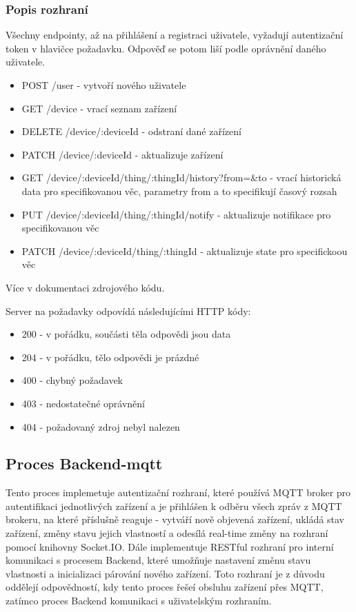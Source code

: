 \subsubsection{Popis rozhraní}
Všechny endpointy, až na přihlášení a registraci uživatele, vyžadují autentizační token v hlavičce požadavku. Odpověď se potom liší podle oprávnění daného uživatele.
\begin{itemize}
    \item POST /user - vytvoří nového uživatele
    \item GET /device - vrací seznam zařízení
    \item DELETE /device/:deviceId - odstraní dané zařízení
    \item PATCH /device/:deviceId - aktualizuje zařízení
    \item GET /device/:deviceId/thing/:thingId/history?from=\&to - vrací historická data pro specifikovanou věc, parametry from a to specifikují časový rozsah
    \item PUT /device/:deviceId/thing/:thingId/notify - aktualizuje notifikace pro specifikovanou věc
    \item PATCH /device/:deviceId/thing/:thingId - aktualizuje state pro specifickoou věc
\end{itemize}
Více v dokumentaci zdrojového kódu.

Server na požadavky odpovídá následujícími HTTP kódy:
\begin{itemize}
    \item 200 - v pořádku, součásti těla odpovědi jsou data
    \item 204 - v pořádku, tělo odpovědi je prázdné
    \item 400 - chybný požadavek
    \item 403 - nedostatečné oprávnění
    \item 404 - požadovaný zdroj nebyl nalezen
\end{itemize}


\subsection{Proces Backend-mqtt}
Tento proces implemetuje autentizační rozhraní, které používá MQTT broker pro autentifikaci jednotlivých zařízení a je přihlášen k odběru všech zpráv z MQTT brokeru, na které příslušně reaguje - vytváří nově objevená zařízení, ukládá stav zařízení, změny stavu jejich vlastností a odesílá real-time změny na rozhraní pomocí knihovny Socket.IO. Dále implementuje RESTful rozhraní pro interní komunikaci s procesem Backend, které umožňuje nastavení změnu stavu vlastnosti a inicializaci párování nového zařízení. Toto rozhraní je z důvodu oddělejí odpovědností, kdy tento proces řešeí obsluhu zařízení přes MQTT, zatímco proces Backend komunikaci s uživatelským rozhraním.


